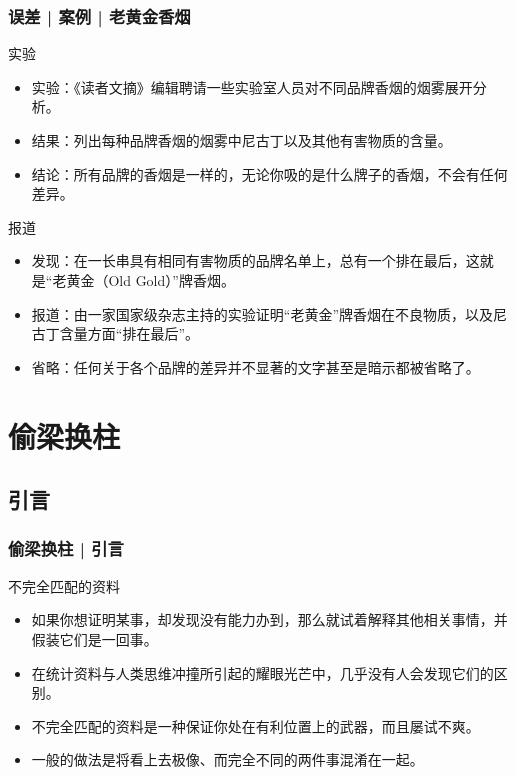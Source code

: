 \begin{frame}
  \frametitle{误差 | 案例 | 老黄金香烟}
  \begin{block}{实验}
    \begin{itemize}
      \item 实验：《读者文摘》编辑聘请一些实验室人员对不同品牌香烟的烟雾展开分析。
      \item 结果：列出每种品牌香烟的烟雾中尼古丁以及其他有害物质的含量。
      \item 结论：所有品牌的香烟是一样的，无论你吸的是什么牌子的香烟，不会有任何差异。
    \end{itemize}
  \end{block}
  \pause
  \begin{block}{报道}
    \begin{itemize}
      \item 发现：在一长串具有相同有害物质的品牌名单上，总有一个排在最后，这就是“老黄金（Old Gold）”牌香烟。
      \item 报道：由一家国家级杂志主持的实验证明“老黄金”牌香烟在不良物质，以及尼古丁含量方面“排在最后”。
      \item 省略：任何关于各个品牌的差异并不显著的文字甚至是暗示都被省略了。
    \end{itemize}
  \end{block}
\end{frame}

\section{偷梁换柱}
\subsection{引言}
\begin{frame}
  \frametitle{偷梁换柱 | 引言}
  \begin{block}{不完全匹配的资料}
    \begin{itemize}
      \item 如果你想证明某事，却发现没有能力办到，那么就试着解释其他相关事情，并假装它们是一回事。
      \item 在统计资料与人类思维冲撞所引起的耀眼光芒中，几乎没有人会发现它们的区别。
      \item 不完全匹配的资料是一种保证你处在有利位置上的武器，而且屡试不爽。
      \item 一般的做法是将看上去极像、而完全不同的两件事混淆在一起。
    \end{itemize}
  \end{block}
\end{frame}

